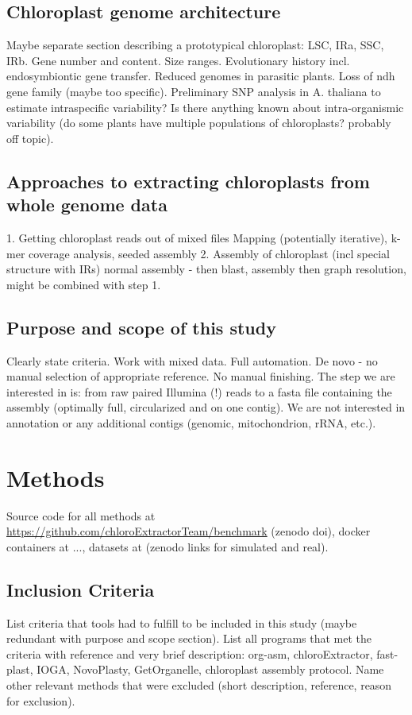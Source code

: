 \documentclass{bmcart}
\begin{document}
\subsection*{Chloroplast genome architecture}
Maybe separate section describing a prototypical chloroplast: LSC, IRa, SSC, IRb. Gene number and content. Size ranges. Evolutionary history incl. endosymbiontic gene transfer. Reduced genomes in parasitic plants. Loss of ndh gene family (maybe too specific). Preliminary SNP analysis in A. thaliana to estimate intraspecific variability? Is there anything known about intra-organismic variability (do some plants have multiple populations of chloroplasts? probably off topic).

\subsection*{Approaches to extracting chloroplasts from whole genome data}
1. Getting chloroplast reads out of mixed files
Mapping (potentially iterative), k-mer coverage analysis, seeded assembly
2. Assembly of chloroplast (incl special structure with IRs)
normal assembly - then blast, assembly then graph resolution, might be combined with step 1.

\subsection*{Purpose and scope of this study}
Clearly state criteria. Work with mixed data. Full automation. De novo - no manual selection of appropriate reference. No manual finishing. The step we are interested in is: from raw paired Illumina (!) reads to a fasta file containing the assembly (optimally full, circularized and on one contig). We are not interested in annotation or any additional contigs (genomic, mitochondrion, rRNA, etc.).

\section*{Methods}
Source code for all methods at \url{https://github.com/chloroExtractorTeam/benchmark} (zenodo doi), docker containers at ..., datasets at (zenodo links for simulated and real).

\subsection*{Inclusion Criteria}
List criteria that tools had to fulfill to be included in this study (maybe redundant with purpose and scope section).
List all programs that met the criteria with reference and very brief description:
org-asm, chloroExtractor, fast-plast, IOGA, NovoPlasty, GetOrganelle, chloroplast assembly protocol.
Name other relevant methods that were excluded (short description, reference, reason for exclusion).
\end{document}
